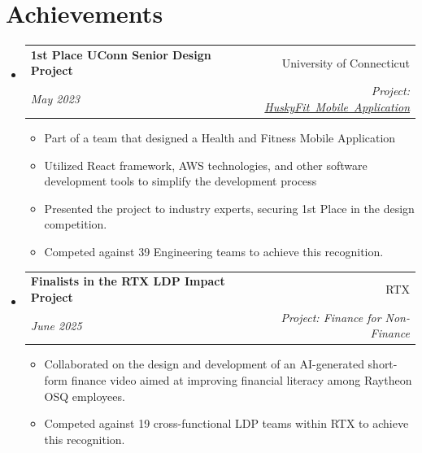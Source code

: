 \documentclass[a4paper,11pt]{article}
\makeatletter
\newcommand{\resumeItemCustom}[2]{
  \item\small{
    \textbf{#1}{ #2 \vspace{-2pt}}
  }
}
\newcommand{\resumeSubheading}[4]{
  \vspace{-1pt}\item
    \begin{tabular*}{0.97\textwidth}{l@{\extracolsep{\fill}}r}
      \textbf{#1} & #2 \\
      \textit{#3} & \textit{#4} \\
    \end{tabular*}\vspace{-5pt}
}
\newcommand{\resumeSubHeadingListStart}{\begin{itemize}[leftmargin=*]}
\newcommand{\resumeSubHeadingListEnd}{\end{itemize}}
\newcommand{\resumeItemListStart}{\begin{itemize}}
\newcommand{\resumeItemListEnd}{\end{itemize}\vspace{-5pt}}
\makeatother
\begin{document}
\section{Achievements}
\resumeSubHeadingListStart
    \resumeSubheading
        {1st Place UConn Senior Design Project}
        {University of Connecticut}{May 2023}
        {Project: \href{https://seniordesignday.engr.uconn.edu/seniorprojectpt/senior-design-2023-computer-science-and-engineering-team-05/}{\mbox{HuskyFit Mobile Application}}}
        \resumeItemListStart
            \resumeItemCustom{}{Part of a team that designed a Health and Fitness Mobile Application}
            \resumeItemCustom{}{Utilized React framework, AWS technologies, and other software development tools to simplify the development process }
            \resumeItemCustom{}{Presented the project to industry experts, securing 1st Place in the design competition.}
            \resumeItemCustom{}{Competed against 39 Engineering teams to achieve this recognition.}
        \resumeItemListEnd

    \resumeSubheading
        {Finalists in the RTX LDP Impact Project}
        {RTX}{June 2025}
        {Project: Finance for Non-Finance}
        \resumeItemListStart
            \resumeItemCustom{}{Collaborated on the design and development of an AI-generated short-form finance video aimed at improving financial literacy among Raytheon OSQ employees.}
            \resumeItemCustom{}{Competed against 19 cross-functional LDP teams within RTX to achieve this recognition.}
        \resumeItemListEnd
\resumeSubHeadingListEnd

\end{document}
